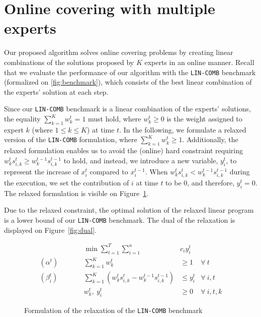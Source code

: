 
\section{Online covering with multiple experts}	\label{sec:covering}

Our proposed algorithm solves online covering problems by creating linear combinations of the solutions proposed by $K$ experts in an online manner.
Recall that we evaluate the performance of our algorithm with the \texttt{LIN-COMB} benchmark (formalized on \cref{fig:benchmark}), which consists of the best linear combination of the experts' solution at each step.

Since our \texttt{LIN-COMB} benchmark is a linear combination of the experts' solutions, the equality $ \sum_{k=1}^{K} w_{k}^{t} = 1$ must hold, where $w_{k}^{t} \geq 0$ is the weight assigned to expert $k$ (where $1 \leq k \leq K$) at time $t$. In the following, we formulate a relaxed version of the \texttt{LIN-COMB} formulation, where
$\sum_{k=1}^{K} w_{k}^{t} \geq 1$. Additionally, the relaxed formulation enables us to avoid the (online) hard constraint requiring $w_{k}^{t} s_{i,k}^{t} \geq w_{k}^{t-1} s_{i,k}^{t-1}$ to hold, and instead, we introduce a new variable, $y_{i}^{t}$, to represent the increase of $x_{i}^{t}$ compared to $x_{i}^{t-1}$. When $w_{k}^{t} s_{i,k}^{t} < w_{k}^{t-1} s_{i,k}^{t-1}$ during the execution, we set the contribution of $i$ at time $t$ to be 0, and therefore, $y_{i}^{t} = 0$.
The relaxed formulation is visible on Figure~\ref{fig:relaxation}.

Due to the relaxed constraint, the optimal solution of the relaxed linear program is a lower bound of our \texttt{LIN-COMB} benchmark. The dual of the relaxation is displayed on Figure~\ref{fig:dual}.


\begin{figure}[ht]
	\begin{mdframed}
		\begin{align*}
			&& \min \sum_{t = 1}^{T} \sum_{i=1}^{n} & c_i y_i^t \\
			(\alpha^{t}) \qquad && \sum_{k=1}^{K} w_{k}^{t} & \geq 1  & \forall\ t \\
			(\beta_{i}^{t}) \qquad && \sum_{k=1}^{K} \left(w_{k}^{t} s_{i,k}^{t} - w_{k}^{t-1} s_{i,k}^{t-1} \right) &\leq y_i^t  &\forall\ i,t\\
			&& w_{k}^{t},\ y_{i}^{t} & \ge 0 & \forall\ i,t,k
		\end{align*}
	\end{mdframed}
	\caption{Formulation of the relaxation of the \texttt{LIN-COMB} benchmark}
	\label{fig:relaxation}
\end{figure}

